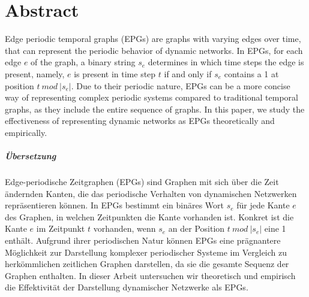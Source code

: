 \chapter*{Abstract}
Edge periodic temporal graphs (EPGs) are graphs with varying edges over time, that can represent the periodic behavior of dynamic networks. In EPGs, for each edge $e$ of the graph, a binary string $s_e$ determines in which time steps the edge is present, namely, $e$ is present in time step $t$ if and only if $s_e$ contains a 1 at position $t~ mod~ |s_e|$. Due to their periodic nature, EPGs can be a more concise way of representing complex periodic systems compared to traditional temporal graphs, as they include the entire sequence of graphs. In this paper, we study the effectiveness of representing dynamic networks as EPGs theoretically and empirically.

\paragraph{Übersetzung}
Edge-periodische Zeitgraphen (EPGs) sind Graphen mit sich über die Zeit ändernden Kanten, die das periodische Verhalten von dynamischen Netzwerken repräsentieren können. In EPGs bestimmt ein binäres Wort $s_e$ für jede Kante $e$ des Graphen, in welchen Zeitpunkten die Kante vorhanden ist. Konkret ist die Kante $e$ im Zeitpunkt $t$ vorhanden, wenn $s_e$ an der Position $t~ mod~ |s_e|$ eine 1 enthält. Aufgrund ihrer periodischen Natur können EPGs eine prägnantere Möglichkeit zur Darstellung komplexer periodischer Systeme im Vergleich zu herkömmlichen zeitlichen Graphen darstellen, da sie die gesamte Sequenz der Graphen enthalten. In dieser Arbeit untersuchen wir theoretisch und empirisch die Effektivität der Darstellung dynamischer Netzwerke als EPGs.